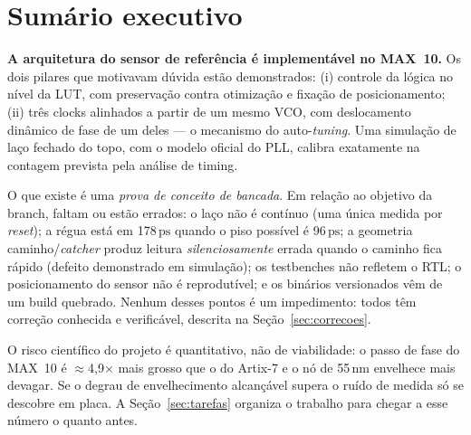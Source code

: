 \documentclass[11pt,a4paper]{article}
\newcommand{\ps}{\ensuremath{\,\mathrm{ps}}\xspace}
\begin{document}
\setcounter{page}{1}
\tableofcontents
\clearpage
{}
\setcounter{page}{1}

\section*{Sumário executivo}

\begin{okbox}[title={Veredito}]
\textbf{A arquitetura do sensor de referência é implementável no MAX~10.} Os dois pilares
que motivavam dúvida estão demonstrados: (i) controle da lógica no nível da LUT,
com preservação contra otimização e fixação de posicionamento; (ii) três clocks alinhados
a partir de um mesmo VCO, com deslocamento dinâmico de fase de um deles --- o mecanismo
do auto-\emph{tuning}. Uma simulação de laço fechado do topo, com o modelo oficial do
PLL, calibra exatamente na contagem prevista pela análise de timing.
\end{okbox}

\begin{warnbox}[title={Mas o trabalho ainda está antes do Gate A}]
O que existe é uma \emph{prova de conceito de bancada}. Em relação ao objetivo da
branch, faltam ou estão errados: o laço não é contínuo (uma única medida por
\emph{reset}); a régua está em 178\ps quando o piso possível é 96\ps; a geometria
caminho/\emph{catcher} produz leitura \emph{silenciosamente} errada quando o caminho
fica rápido (defeito demonstrado em simulação); os testbenches não refletem o RTL;
o posicionamento do sensor não é reprodutível; e os binários versionados vêm de um
build quebrado. Nenhum desses pontos é um impedimento: todos têm correção conhecida
e verificável, descrita na Seção~\ref{sec:correcoes}.
\end{warnbox}

\begin{notebox}[title={O que permanece genuinamente incerto}]
O risco científico do projeto é quantitativo, não de viabilidade: o passo de fase do
MAX~10 é $\approx$4{,}9$\times$ mais grosso que o do Artix-7 e o nó de 55\,nm envelhece
mais devagar. Se o degrau de envelhecimento alcançável supera o ruído de medida só se
descobre em placa. A Seção~\ref{sec:tarefas} organiza o trabalho para chegar a esse número
o quanto antes.
\end{notebox}
\end{document}
